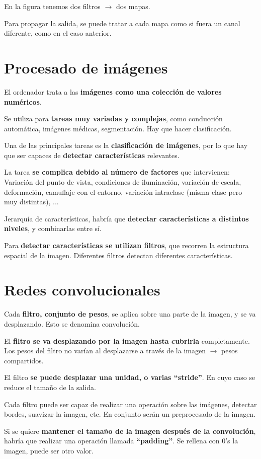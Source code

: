 \documentclass[12pt, twoside, openright]{report} %
\begin{document}
En la figura tenemos dos filtros $\rightarrow$ dos mapas.

Para propagar la salida, se puede tratar a cada mapa como si fuera un canal diferente, como en el caso anterior.

\section{Procesado de imágenes}
El ordenador trata a las \textbf{imágenes como una colección de valores numéricos}.

Se utiliza para \textbf{tareas muy variadas y complejas}, como conducción automática, imágenes médicas, segmentación. Hay que hacer clasificación.

Una de las principales tareas es la \textbf{clasificación de imágenes}, por lo que hay que ser capaces de \textbf{detectar características} relevantes.

La tarea \textbf{se complica debido al número de factores} que intervienen: Variación del punto de vista, condiciones de iluminación, variación de escala, deformación, camuflaje con el entorno, variación intraclase (misma clase pero muy distintas), ...

Jerarquía de características, habría que \textbf{detectar características a distintos niveles}, y combinarlas entre sí.

Para \textbf{detectar características se utilizan filtros}, que recorren la estructura espacial de la imagen. Diferentes filtros detectan diferentes características.
\pagebreak

\section{Redes convolucionales}
Cada \textbf{filtro, conjunto de pesos}, se aplica sobre una parte de la imagen, y se va desplazando. Esto se denomina convolución.

El \textbf{filtro se va desplazando por la imagen hasta cubrirla} completamente. Los pesos del filtro no varían al desplazarse a través de la imagen $\rightarrow$ pesos compartidos.

El filtro \textbf{se puede desplazar una unidad, o varias “stride”}. En cuyo caso se reduce el tamaño de la salida.

Cada filtro puede ser capaz de realizar una operación sobre las imágenes, detectar bordes, suavizar la imagen, etc. En conjunto serán un preprocesado de la imagen.

Si se quiere \textbf{mantener el tamaño de la imagen después de la convolución}, habría que realizar una operación llamada \textbf{“padding”}. Se rellena con 0's la imagen, puede ser otro valor.
\end{document}
